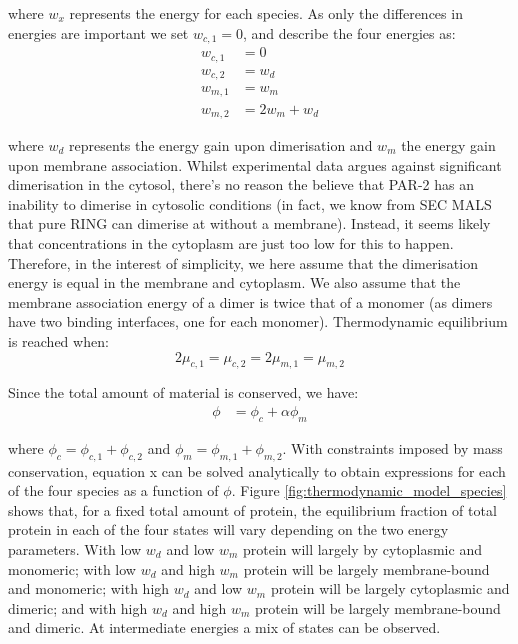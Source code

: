 \documentclass[12pt]{"article"}
\begin{document}
where $w_x$ represents the energy for each species. As only the differences in energies are important we set $w_{c,1} = 0$, and describe the four energies as:
\begin{align}
w_{c,1} &= 0\\
w_{c,2} &= w_d\\
w_{m,1} &= w_m\\
w_{m,2} &= 2w_m + w_d
\end{align}

where $w_d$ represents the energy gain upon dimerisation and $w_m$ the energy gain upon membrane association. Whilst experimental data argues against significant dimerisation in the cytosol, there's no reason the believe that PAR-2 has an inability to dimerise in cytosolic conditions (in fact, we know from SEC MALS that pure RING can dimerise at without a membrane). Instead, it seems likely that concentrations in the cytoplasm are just too low for this to happen. Therefore, in the interest of simplicity, we here assume that the dimerisation energy is equal in the membrane and cytoplasm. We also assume that the membrane association energy of a dimer is twice that of a monomer (as dimers have two binding interfaces, one for each monomer). Thermodynamic equilibrium is reached when:
\begin{equation}
2\mu_{c,1} = \mu_{c,2} = 2\mu_{m,1} = \mu_{m,2}
\end{equation}

Since the total amount of material is conserved, we have:
\begin{align}
\phi &= \phi_c + \alpha\phi_m
\end{align}

where $\phi_c = \phi_{c,1} + \phi_{c,2}$ and $\phi_m = \phi_{m,1} + \phi_{m,2}$. With constraints imposed by mass conservation, equation x can be solved analytically to obtain expressions for each of the four species as a function of $\phi$. Figure \ref{fig:thermodynamic_model_species} shows that, for a fixed total amount of protein, the equilibrium fraction of total protein in each of the four states will vary depending on the two energy parameters. With low $w_d$ and low $w_m$ protein will largely by cytoplasmic and monomeric; with low $w_d$ and high $w_m$ protein will be largely membrane-bound and monomeric; with high $w_d$ and low $w_m$ protein will be largely cytoplasmic and dimeric; and with high $w_d$ and high $w_m$ protein will be largely membrane-bound and dimeric. At intermediate energies a mix of states can be observed.\\
\end{document}
